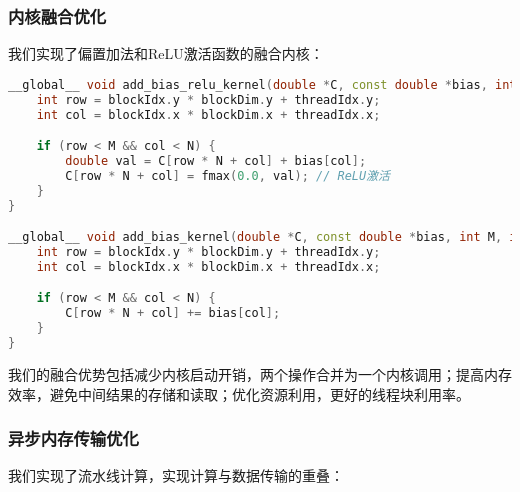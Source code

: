 \documentclass[12pt,a4paper]{article}
\begin{document}
\subsubsection{内核融合优化}

我们实现了偏置加法和ReLU激活函数的融合内核：

\begin{lstlisting}[language=c++,caption=内核融合优化实现]
__global__ void add_bias_relu_kernel(double *C, const double *bias, int M, int N) {
    int row = blockIdx.y * blockDim.y + threadIdx.y;
    int col = blockIdx.x * blockDim.x + threadIdx.x;

    if (row < M && col < N) {
        double val = C[row * N + col] + bias[col];
        C[row * N + col] = fmax(0.0, val); // ReLU激活
    }
}

__global__ void add_bias_kernel(double *C, const double *bias, int M, int N) {
    int row = blockIdx.y * blockDim.y + threadIdx.y;
    int col = blockIdx.x * blockDim.x + threadIdx.x;

    if (row < M && col < N) {
        C[row * N + col] += bias[col];
    }
}
\end{lstlisting}

我们的融合优势包括减少内核启动开销，两个操作合并为一个内核调用；提高内存效率，避免中间结果的存储和读取；优化资源利用，更好的线程块利用率。

\subsubsection{异步内存传输优化}

我们实现了流水线计算，实现计算与数据传输的重叠：
\end{document}
